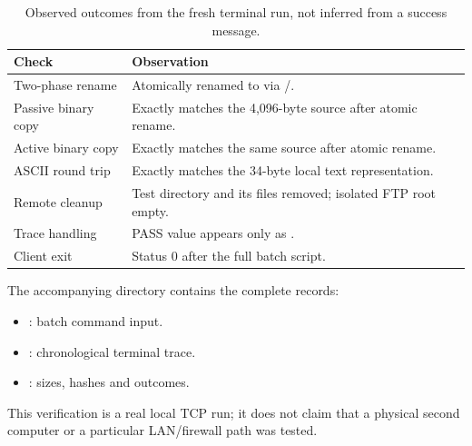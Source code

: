 \begin{table}[H]
\centering\small
\caption{Observed outcomes from the fresh terminal run, not inferred from a success message.}
\label{tab:terminal-outcomes}
\begin{tabularx}{\linewidth}{@{}l Y@{}}
\toprule
Check & Observation \\
\midrule
Two-phase rename & Atomically renamed  to  via /. \\
Passive binary copy & Exactly matches the 4,096-byte source after atomic rename. \\
Active binary copy & Exactly matches the same source after atomic rename. \\
ASCII round trip & Exactly matches the 34-byte local text representation. \\
Remote cleanup & Test directory and its files removed; isolated FTP root empty. \\
Trace handling & PASS value appears only as . \\
Client exit & Status 0 after the full batch script. \\
\bottomrule
\end{tabularx}
\end{table}

The accompanying  directory contains the complete records:
\begin{itemize}[nosep]
\item {}: batch command input.
\item {}: chronological terminal trace.
\item {}: sizes, hashes and outcomes.
\end{itemize}
This verification is a real local TCP run; it does not claim that a physical second computer or a particular LAN/firewall path was tested.
